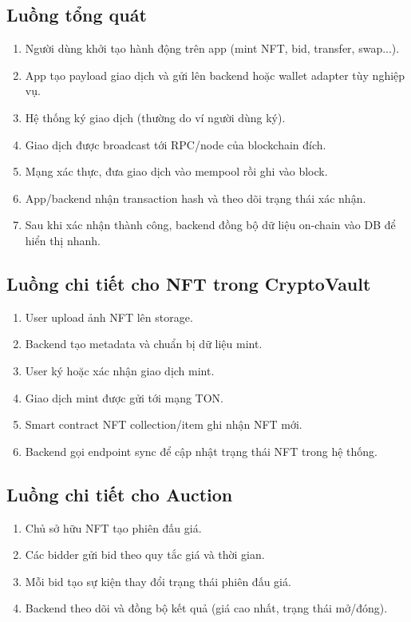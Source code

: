 \documentclass[a4paper,12pt]{report}
\begin{document}
\subsection{Luồng tổng quát}
\begin{enumerate}
    \item Người dùng khởi tạo hành động trên app (mint NFT, bid, transfer, swap...).
    \item App tạo payload giao dịch và gửi lên backend hoặc wallet adapter tùy nghiệp vụ.
    \item Hệ thống ký giao dịch (thường do ví người dùng ký).
    \item Giao dịch được broadcast tới RPC/node của blockchain đích.
    \item Mạng xác thực, đưa giao dịch vào mempool rồi ghi vào block.
    \item App/backend nhận transaction hash và theo dõi trạng thái xác nhận.
    \item Sau khi xác nhận thành công, backend đồng bộ dữ liệu on-chain vào DB để hiển thị nhanh.
\end{enumerate}

\subsection{Luồng chi tiết cho NFT trong CryptoVault}
\begin{enumerate}
    \item User upload ảnh NFT lên storage.
    \item Backend tạo metadata và chuẩn bị dữ liệu mint.
    \item User ký hoặc xác nhận giao dịch mint.
    \item Giao dịch mint được gửi tới mạng TON.
    \item Smart contract NFT collection/item ghi nhận NFT mới.
    \item Backend gọi endpoint sync để cập nhật trạng thái NFT trong hệ thống.
\end{enumerate}

\subsection{Luồng chi tiết cho Auction}
\begin{enumerate}
    \item Chủ sở hữu NFT tạo phiên đấu giá.
    \item Các bidder gửi bid theo quy tắc giá và thời gian.
    \item Mỗi bid tạo sự kiện thay đổi trạng thái phiên đấu giá.
    \item Backend theo dõi và đồng bộ kết quả (giá cao nhất, trạng thái mở/đóng).
\end{enumerate}
\end{document}
